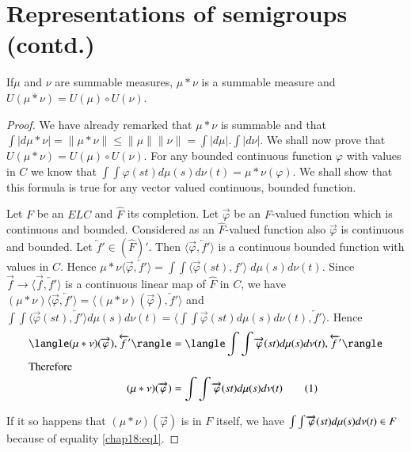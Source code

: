 
\chapter{Representations of semigroups (contd.)}\label{chap18}

\setcounter{section}{18}
\setcounter{lemma}{0}
\begin{lemma}\label{chap18:lem18.1}
If\pageoriginale $\mu$ and $\nu$ are summable measures, $\mu * \nu$ is
a summable measure and $U(\mu * \nu)= U (\mu)\circ U(\nu)$. 
\end{lemma}
\begin{proof}
We have already remarked that $\mu * \nu$ is summable and that $\int
|d \mu * \nu | = \parallel \mu * \nu \parallel \leq
\parallel\mu\parallel \parallel\nu\parallel = \int |d \mu |. \int |d \nu |$. We
shall now prove that $U(\mu * \nu) = U(\mu)\circ U(\nu)$. For any
bounded continuous function $\varphi$ with values in $C$ we know that
$\int \int \varphi(st) d \mu (s) d \nu(t) = \mu * \nu (\varphi)$. We
shall show that this formula is true for any vector valued continuous,
bounded function. 

Let $F$ be an $E L C$ and $\hat{F}$ its completion. Let
$\overrightarrow{\varphi}$ be an $F$-valued function which is
continuous and bounded. Considered as an $\hat{F}$-valued function
also $\overrightarrow{\varphi}$ is continuous and bounded. Let
$\overleftarrow{f}' \in (\hat{F})'$. Then $\langle
\overrightarrow{\varphi}, \overleftarrow{f}' \rangle$ is a continuous
bounded function with values in $C$. Hence \quad $\mu * \nu \langle
\overrightarrow{\varphi}, \overleftarrow{f}' \rangle = \int \int
\langle \overrightarrow{\varphi} (st), f' \rangle \; d \mu(s)d
\nu(t)$. Since $\overrightarrow{f} \to \langle \overrightarrow{f},
\overleftarrow{f}'\rangle$ is a continuous linear map of $\hat{F}$ 
in $C$, we have $(\mu * \nu) \langle \overrightarrow{\varphi},
\overleftarrow{f}' \rangle = \langle ( \mu * \nu)
(\overrightarrow{\varphi}), \overleftarrow{f}' \rangle$ and
$\int\int\langle \overrightarrow{\varphi}(st),
\overleftarrow{f}'\rangle
d\mu(s)d\nu(t)=\langle\int\int\overrightarrow{\varphi}(st) d\mu(s)
d\nu(t), \overleftarrow{f}'\rangle$. Hence 
\begin{align}
\langle(\mu * \nu)(\overrightarrow{\varphi}),
\overleftarrow{f}'\rangle &=
\langle\int\int\overrightarrow{\varphi}(st) d\mu(s) d\nu(t),
\overleftarrow{f}'\rangle\notag\\
\intertext{Therefore} \quad (\mu * \nu)(\overrightarrow{\varphi}) &=
\int\int \overrightarrow{\varphi}(st) d \mu (s) d
\nu(t)\tag{1}\label{chap18:eq1}
\end{align}
 
\noindent If it so happens that $(\mu * \nu)(\overrightarrow{\varphi})$ is in
$F$ itself, we have $\int\int\overrightarrow{\varphi}(st) d\mu\break(s) d
\nu(t) \in F$ because of equality \eqref{chap18:eq1}.
\end{proof}
